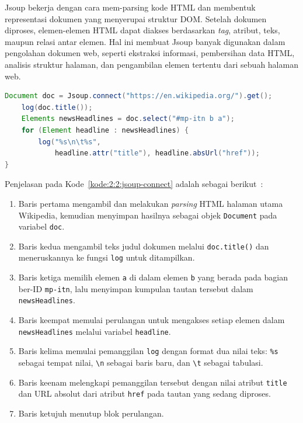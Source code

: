 Jsoup bekerja dengan cara mem-parsing kode HTML dan membentuk representasi dokumen yang menyerupai struktur DOM. Setelah dokumen diproses, elemen-elemen HTML dapat diakses berdasarkan \textit{tag}, atribut, teks, maupun relasi antar elemen. Hal ini membuat Jsoup banyak digunakan dalam pengolahan dokumen web, seperti ekstraksi informasi, pembersihan data HTML, analisis struktur halaman, dan pengambilan elemen tertentu dari sebuah halaman web.

\begin{lstlisting}[language=java, caption=Potongan kode dengan fungsi mengambil \textit{homepage} Wikipedia lalu melakukan \textit{parse} menjadi DOM dan memilih judul berita dari bagian "Berita" ke dalam daftar Elemen, label=kode:2:2:jsoup-connect]
	Document doc = Jsoup.connect("https://en.wikipedia.org/").get();
	log(doc.title());
	Elements newsHeadlines = doc.select("#mp-itn b a");
	for (Element headline : newsHeadlines) {
		log("%s\n\t%s", 
			headline.attr("title"), headline.absUrl("href"));
}
\end{lstlisting}

Penjelasan pada Kode~\ref{kode:2:2:jsoup-connect} adalah sebagai berikut~\cite{jsoup:26:jsoup}:
\begin{enumerate}[itemsep=0mm]
    \item Baris pertama mengambil dan melakukan \textit{parsing} HTML halaman utama Wikipedia, kemudian menyimpan hasilnya sebagai objek \texttt{Document} pada variabel \texttt{doc}.
    \item Baris kedua mengambil teks judul dokumen melalui \texttt{doc.title()} dan meneruskannya ke fungsi \texttt{log} untuk ditampilkan.
    \item Baris ketiga memilih elemen \texttt{a} di dalam elemen \texttt{b} yang berada pada bagian ber-ID \texttt{mp-itn}, lalu menyimpan kumpulan tautan tersebut dalam \texttt{newsHeadlines}.
    \item Baris keempat memulai perulangan untuk mengakses setiap elemen dalam \texttt{newsHeadlines} melalui variabel \texttt{headline}.
    \item Baris kelima memulai pemanggilan \texttt{log} dengan format dua nilai teks: \verb|%s| sebagai tempat nilai, \verb|\n| sebagai baris baru, dan \verb|\t| sebagai tabulasi.
    \item Baris keenam melengkapi pemanggilan tersebut dengan nilai atribut \texttt{title} dan URL absolut dari atribut \texttt{href} pada tautan yang sedang diproses.
    \item Baris ketujuh menutup blok perulangan.
\end{enumerate}

